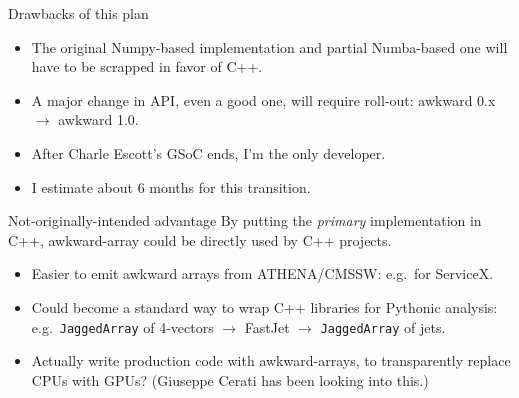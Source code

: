 \documentclass[aspectratio=169]{beamer}
\begin{document}
\begin{frame}{Drawbacks of this plan}
\vspace{0.25 cm}
\Large
\begin{itemize}
\item The original Numpy-based implementation and partial Numba-based one will have to be scrapped in favor of C++.


\item A major change in API, even a good one, will require roll-out: awkward 0.x $\to$ awkward 1.0.


\item After Charle Escott's GSoC ends, I'm the only developer.


\item I estimate about 6 months for this transition.

\end{itemize}
\end{frame}

\begin{frame}{Not-originally-intended advantage}
\Large
\vspace{0.5 cm}
By putting the {\it primary} implementation in C++, awkward-array could be directly used by C++ projects.

\large
\vspace{0.25 cm}
\begin{itemize}\setlength{\itemsep}{0.25 cm}
\item Easier to emit awkward arrays from ATHENA/CMSSW: e.g.\ for ServiceX.
\item Could become a standard way to wrap C++ libraries for Pythonic analysis: e.g.\ {\tt JaggedArray} of 4-vectors $\to$ FastJet $\to$ {\tt JaggedArray} of jets.
\item Actually write production code with awkward-arrays, to transparently replace CPUs with GPUs? (Giuseppe Cerati has been looking into this.)
\end{itemize}

\end{frame}
\end{document}
